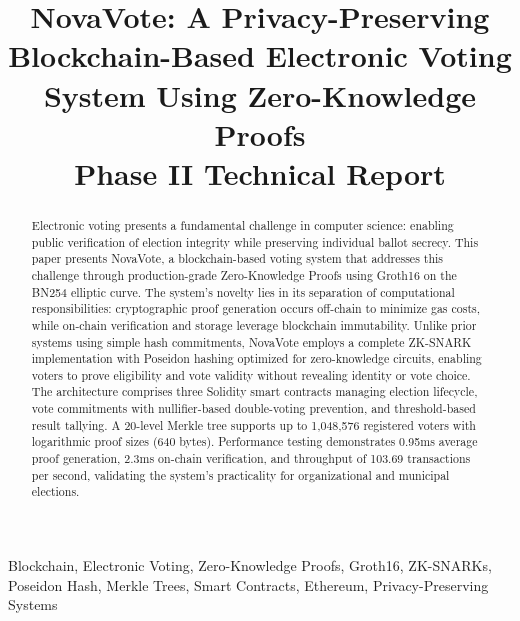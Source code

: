 \documentclass[conference]{IEEEtran}
\begin{document}
\title{NovaVote: A Privacy-Preserving Blockchain-Based Electronic Voting System Using Zero-Knowledge Proofs\\
{\large Phase II Technical Report}}

\author{
\and
{}
}

\maketitle

\begin{abstract}
Electronic voting presents a fundamental challenge in computer science: enabling public verification of election integrity while preserving individual ballot secrecy. This paper presents NovaVote, a blockchain-based voting system that addresses this challenge through production-grade Zero-Knowledge Proofs using Groth16 on the BN254 elliptic curve. The system's novelty lies in its separation of computational responsibilities: cryptographic proof generation occurs off-chain to minimize gas costs, while on-chain verification and storage leverage blockchain immutability. Unlike prior systems using simple hash commitments, NovaVote employs a complete ZK-SNARK implementation with Poseidon hashing optimized for zero-knowledge circuits, enabling voters to prove eligibility and vote validity without revealing identity or vote choice. The architecture comprises three Solidity smart contracts managing election lifecycle, vote commitments with nullifier-based double-voting prevention, and threshold-based result tallying. A 20-level Merkle tree supports up to 1,048,576 registered voters with logarithmic proof sizes (640 bytes). Performance testing demonstrates 0.95ms average proof generation, 2.3ms on-chain verification, and throughput of 103.69 transactions per second, validating the system's practicality for organizational and municipal elections.
\end{abstract}

\begin{IEEEkeywords}
Blockchain, Electronic Voting, Zero-Knowledge Proofs, Groth16, ZK-SNARKs, Poseidon Hash, Merkle Trees, Smart Contracts, Ethereum, Privacy-Preserving Systems
\end{IEEEkeywords}
\end{document}
